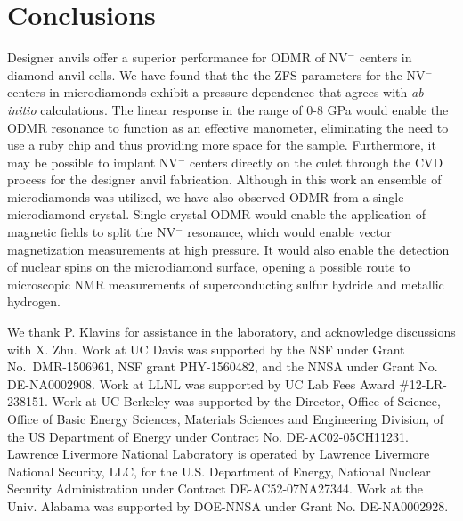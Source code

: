 \documentclass[%
 aip,
 sd,%
 amsmath,amssymb,
 reprint,%
 longbibliography
]{revtex4-1}
\begin{document}
\section{Conclusions}

Designer anvils offer a superior performance for ODMR of NV$^-$ centers in diamond anvil cells.  We have found that the the ZFS parameters for the NV$^-$ centers in microdiamonds exhibit a pressure dependence that agrees with \textit{ab initio} calculations. The linear response in the range of 0-8 GPa would enable the ODMR resonance to function as an effective manometer, eliminating the need to use a ruby chip and thus providing more space for the sample.  Furthermore, it may be possible to implant NV$^-$ centers directly on the culet through the CVD process for the designer anvil fabrication.  Although in this work an ensemble of microdiamonds was utilized, we have also observed ODMR from a single microdiamond crystal.  Single crystal ODMR would enable the application of magnetic fields to split the NV$^-$ resonance, which would enable vector magnetization measurements at high pressure.\cite{SteinartNVimaging} It would also enable the detection of nuclear spins on the microdiamond surface,\cite{WratchrupScience2013} opening a possible route to microscopic NMR measurements of superconducting sulfur hydride and metallic hydrogen.\cite{Drozdov2015,Dias715}


\begin{acknowledgments}
We thank  P. Klavins for assistance in the laboratory, and acknowledge discussions with X. Zhu. Work at UC Davis was supported by the NSF under Grant No.\ DMR-1506961, NSF grant PHY-1560482, and the NNSA under Grant No. DE-NA0002908. Work at LLNL was supported by UC Lab Fees Award \#12-LR-238151. Work at UC Berkeley was supported by the Director, Office of Science, Office of Basic Energy Sciences, Materials Sciences and Engineering Division, of the US Department of Energy under Contract No. DE-AC02-05CH11231. Lawrence Livermore National Laboratory is operated by Lawrence Livermore National Security, LLC, for the U.S. Department of Energy, National Nuclear Security Administration under Contract DE-AC52-07NA27344.  Work at the Univ. Alabama was supported by DOE-NNSA under Grant No. DE-NA0002928.

\end{acknowledgments}


\end{document}
